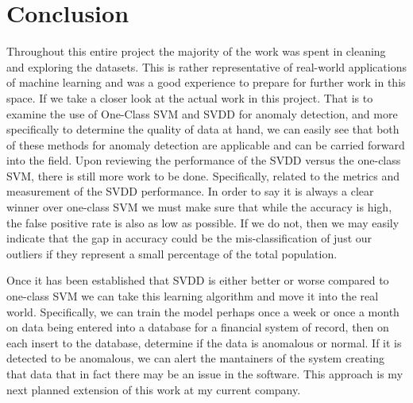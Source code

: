 \documentclass[journal]{IEEEtran}
\begin{document}
\section{Conclusion}
Throughout this entire project the majority of the work was spent in cleaning and exploring the datasets. This is rather representative of real-world applications of machine learning and was a good experience to prepare for further work in this space. If we take a closer look at the actual work in this project. That is to examine the use of One-Class SVM and SVDD for anomaly detection, and more specifically to determine the quality of data at hand, we can easily see that both of these methods for anomaly detection are applicable and can be carried forward into the field. Upon reviewing the performance of the SVDD versus the one-class SVM, there is still more work to be done. Specifically, related to the metrics and measurement of the SVDD performance. In order to say it is always a clear winner over one-class SVM we must make sure that while the accuracy is high, the false positive rate is also as low as possible. If we do not, then we may easily indicate that the gap in accuracy could be the mis-classification of just our outliers if they represent a small percentage of the total population.

Once it has been established that SVDD is either better or worse compared to one-class SVM we can take this learning algorithm and move it into the real world. Specifically, we can train the model perhaps once a week or once a month on data being entered into a database for a financial system of record, then on each insert to the database, determine if the data is anomalous or normal. If it is detected to be anomalous, we can alert the mantainers of the system creating that data that in fact there may be an issue in the software. This approach is my next planned extension of this work at my current company.
\end{document}
